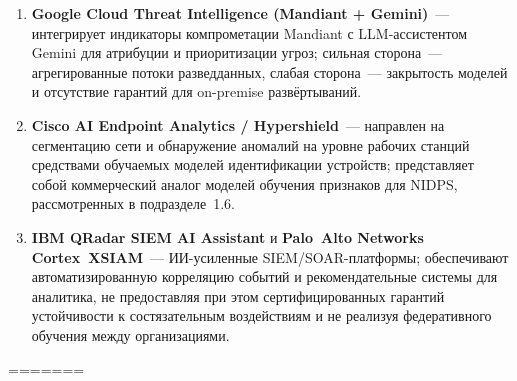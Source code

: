 \begin{enumerate}[leftmargin=2em, itemsep=0pt]
\item \textbf{Google Cloud Threat Intelligence (Mandiant +
Gemini)}~--- интегрирует индикаторы компрометации Mandiant с
LLM-ассистентом Gemini для атрибуции и приоритизации угроз;
сильная сторона~--- агрегированные потоки разведданных, слабая
сторона~--- закрытость моделей и отсутствие гарантий для
on-premise развёртываний.

\item \textbf{Cisco AI Endpoint Analytics / Hypershield}~---
направлен на сегментацию сети и обнаружение аномалий на уровне
рабочих станций средствами обучаемых моделей идентификации
устройств; представляет собой коммерческий аналог моделей
обучения признаков для NIDPS, рассмотренных в подразделе~1.6.

\item \textbf{IBM QRadar SIEM AI Assistant} и \textbf{Palo~Alto
Networks Cortex~XSIAM}~--- ИИ-усиленные SIEM/SOAR-платформы;
обеспечивают автоматизированную корреляцию событий и
рекомендательные системы для аналитика, не предоставляя при этом
сертифицированных гарантий устойчивости к состязательным
воздействиям и не реализуя федеративного обучения между
организациями.

\end{enumerate}
=======
